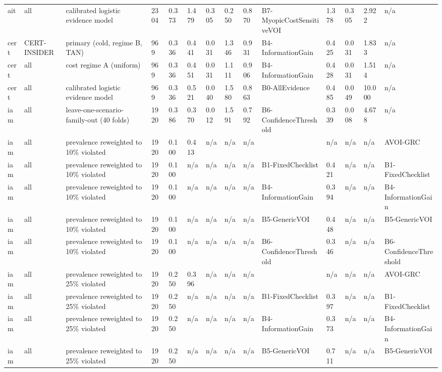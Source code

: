 \begin{table}[!ht]
{\begin{tabular}{llllllllllllll}
ait & all & calibrated logistic evidence model & 2304 & 0.373 & 1.479 & 0.305 & 0.250 & 0.870 & B7-MyopicCostSensitiveVOI & 1.378 & 0.305 & 2.922 & n/a \\
cert & CERT-INSIDER & primary (cold, regime B, TAN) & 969 & 0.336 & 0.441 & 0.031 & 1.346 & 0.931 & B4-InformationGain & 0.425 & 0.031 & 1.833 & n/a \\
cert & all & cost regime A (uniform) & 969 & 0.336 & 0.451 & 0.031 & 1.111 & 0.906 & B4-InformationGain & 0.428 & 0.031 & 1.514 & n/a \\
cert & all & calibrated logistic evidence model & 969 & 0.336 & 0.521 & 0.040 & 1.580 & 0.863 & B0-AllEvidence & 0.485 & 0.049 & 10.000 & n/a \\
iam & all & leave-one-scenario-family-out (40 folds) & 1920 & 0.386 & 0.370 & 0.012 & 1.591 & 0.792 & B6-ConfidenceThreshold & 0.339 & 0.008 & 4.678 & n/a \\
iam & all & prevalence reweighted to 10\% violated & 1920 & 0.100 & 0.413 & n/a & n/a & n/a &  & n/a & n/a & n/a & AVOI-GRC \\
iam & all & prevalence reweighted to 10\% violated & 1920 & 0.100 & n/a & n/a & n/a & n/a & B1-FixedChecklist & 0.421 & n/a & n/a & B1-FixedChecklist \\
iam & all & prevalence reweighted to 10\% violated & 1920 & 0.100 & n/a & n/a & n/a & n/a & B4-InformationGain & 0.394 & n/a & n/a & B4-InformationGain \\
iam & all & prevalence reweighted to 10\% violated & 1920 & 0.100 & n/a & n/a & n/a & n/a & B5-GenericVOI & 0.448 & n/a & n/a & B5-GenericVOI \\
iam & all & prevalence reweighted to 10\% violated & 1920 & 0.100 & n/a & n/a & n/a & n/a & B6-ConfidenceThreshold & 0.346 & n/a & n/a & B6-ConfidenceThreshold \\
iam & all & prevalence reweighted to 25\% violated & 1920 & 0.250 & 0.396 & n/a & n/a & n/a &  & n/a & n/a & n/a & AVOI-GRC \\
iam & all & prevalence reweighted to 25\% violated & 1920 & 0.250 & n/a & n/a & n/a & n/a & B1-FixedChecklist & 0.397 & n/a & n/a & B1-FixedChecklist \\
iam & all & prevalence reweighted to 25\% violated & 1920 & 0.250 & n/a & n/a & n/a & n/a & B4-InformationGain & 0.373 & n/a & n/a & B4-InformationGain \\
iam & all & prevalence reweighted to 25\% violated & 1920 & 0.250 & n/a & n/a & n/a & n/a & B5-GenericVOI & 0.711 & n/a & n/a & B5-GenericVOI \\

\end{tabular}}
\end{table}
